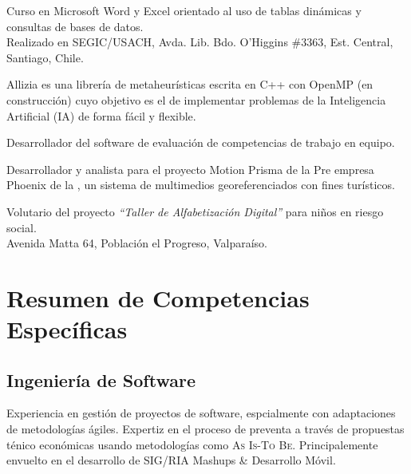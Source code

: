 \documentclass[11pt,letterpaper,roman]{moderncv}
\begin{document}
 {\tchr} {\otecnewline} {\stgo} {}
{Curso \sence en Microsoft Word y Excel orientado al uso de tablas dinámicas y
consultas de bases de datos. \\ Realizado en SEGIC/USACH, Avda. Lib. Bdo. O'Higgins \#3363, Est. Central, Santiago, Chile.}

{Allizia es una librería de metaheurísticas escrita en C++ con OpenMP (en
construcción) cuyo objetivo es el de implementar problemas de la Inteligencia
Artificial (IA) de forma fácil y flexible. }

 { } {} {}
{Desarrollador del software de evaluación de competencias de trabajo en equipo.}



 {\sd} { } {} {}
{Desarrollador y analista para el proyecto Motion Prisma de la Pre empresa
Phoenix de la , un sistema de multimedios georeferenciados con fines
turísticos.}

 {\tchr} {\ernestoquiroz } {\valpo} {}
{Volutario del proyecto \textit{``Taller de Alfabetizaci\'on Digital''}
para niños en riesgo social. \\ Avenida Matta 64, Población el Progreso,
Valparaíso.}
	
	
%


%	
%	
%	
%
%	
\section{Resumen de Competencias Específicas} \subsection{Ingeniería de
Software}  {Experiencia
en gestión de proyectos de software, espcialmente con adaptaciones de
metodologías ágiles. Expertiz en el proceso de preventa a través de propuestas
ténico económicas usando metodologías como \textsc{As Is-To Be}. Principalemente
envuelto en el desarrollo de SIG/RIA Mashups \& Desarrollo Móvil.}
	
\end{document}
